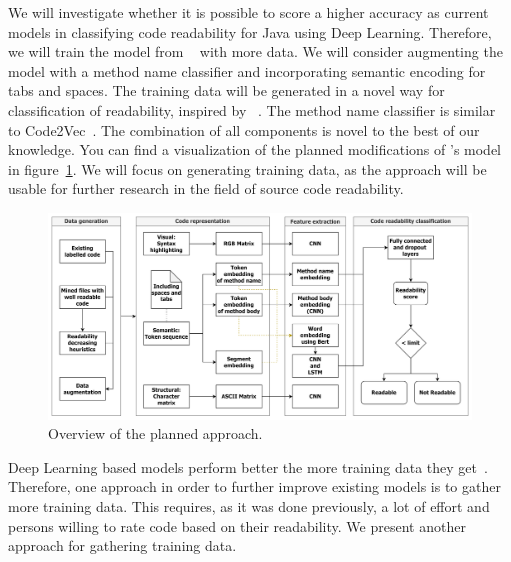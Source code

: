 \documentclass[%
class=scrreprt,
chapterprefix=false,%
open=right,%
twoside=false,%
paper=a4,%
logofile={Logo\_zentral\_farbig\_EN.png},%
thesistype=master,%
UKenglish,%
]{se2thesis}
\begin{document}
	
	We will investigate whether it is possible to score a higher accuracy as current models in classifying code readability for Java using Deep Learning. Therefore, we will train the model from \citeauthor{mi2022towards}~\cite{mi2022towards} with more data. We will consider augmenting the model with a method name classifier and incorporating semantic encoding for tabs and spaces. The training data will be generated in a novel way for classification of readability, inspired by \citeauthor{loriot2022styler}~\cite{loriot2022styler}. The method name classifier is similar to Code2Vec~\cite{alon2019code2vec}. The combination of all components is novel to the best of our knowledge. You can find a visualization of the planned modifications of \citeauthor{mi2022towards}'s model in figure~\ref{fig:model_pipeline}. We will focus on generating training data, as the approach will be usable for further research in the field of source code readability.
	
	\begin{figure}[t]
		\centering
		\includegraphics[width=\textwidth]{Model_pipeline.png}
		\caption{Overview of the planned approach.}
		\label{fig:model_pipeline}
	\end{figure}
	
	Deep Learning based models perform better the more training data they get~\cite{hestness2017deep}. Therefore, one approach in order to further improve existing models is to gather more training data.
	This requires, as it was done previously, a lot of effort and persons willing to rate code based on their readability. We present another approach for gathering training data.
	
\end{document}

